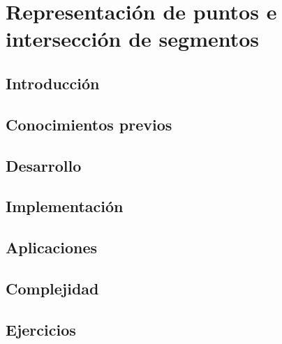 \chapter{Representación de puntos e intersección de segmentos}
\section{Introducción}

\section{Conocimientos previos}

\section{Desarrollo}

\section{Implementación}

\section{Aplicaciones}

\section{Complejidad}

\section{Ejercicios}
